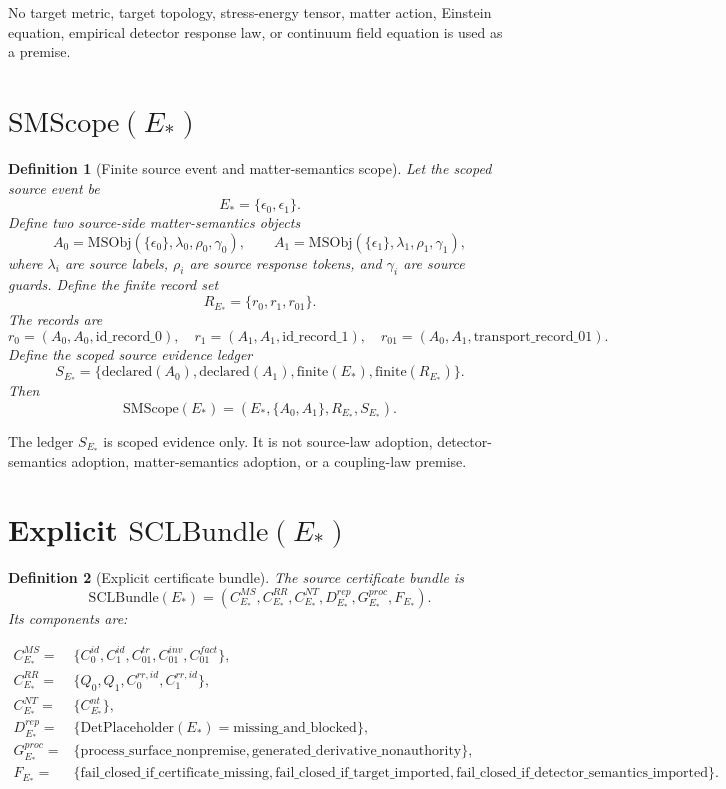 \documentclass[11pt]{article}
\newcommand{\EStar}{E_{\ast}}
\newcommand{\SMScope}{\mathrm{SMScope}}
\newcommand{\SCLBundle}{\mathrm{SCLBundle}}
\newcommand{\DetPlaceholder}{\mathrm{DetPlaceholder}}
\newcommand{\MSObj}{\mathrm{MSObj}}
\newtheorem{definition}{Definition}
\begin{document}
No target metric, target topology, stress-energy tensor, matter action,
Einstein equation, empirical detector response law, or continuum field
equation is used as a premise.

\section{\(\SMScope(\EStar)\)}

\begin{definition}[Finite source event and matter-semantics scope]
Let the scoped source event be
\[
  \EStar=\{\epsilon_0,\epsilon_1\}.
\]
Define two source-side matter-semantics objects
\[
  A_0=\MSObj(\{\epsilon_0\},\lambda_0,\rho_0,\gamma_0),
  \qquad
  A_1=\MSObj(\{\epsilon_1\},\lambda_1,\rho_1,\gamma_1),
\]
where \(\lambda_i\) are source labels, \(\rho_i\) are source response tokens,
and \(\gamma_i\) are source guards. Define the finite record set
\[
  R_{\EStar}=\{r_0,r_1,r_{01}\}.
\]
The records are
\[
  r_0=(A_0,A_0,\mathrm{id\_record\_0}),\quad
  r_1=(A_1,A_1,\mathrm{id\_record\_1}),\quad
  r_{01}=(A_0,A_1,\mathrm{transport\_record\_01}).
\]
Define the scoped source evidence ledger
\[
  S_{\EStar}=
  \{\mathrm{declared}(A_0),\mathrm{declared}(A_1),
    \mathrm{finite}(\EStar),\mathrm{finite}(R_{\EStar})\}.
\]
Then
\[
  \SMScope(\EStar)=
  (\EStar,\{A_0,A_1\},R_{\EStar},S_{\EStar}).
\]
\end{definition}

The ledger \(S_{\EStar}\) is scoped evidence only. It is not source-law
adoption, detector-semantics adoption, matter-semantics adoption, or a
coupling-law premise.

\section{Explicit \(\SCLBundle(\EStar)\)}

\begin{definition}[Explicit certificate bundle]
The source certificate bundle is
\[
  \SCLBundle(\EStar)=
  (C^{MS}_{\EStar},C^{RR}_{\EStar},C^{NT}_{\EStar},
   D^{rep}_{\EStar},G^{proc}_{\EStar},F_{\EStar}).
\]
Its components are:

\begin{align*}
 C^{MS}_{\EStar}={}&
 \{C^{id}_0,C^{id}_1,C^{tr}_{01},C^{inv}_{01},C^{fact}_{01}\},\\
 C^{RR}_{\EStar}={}&
 \{Q_0,Q_1,C^{rr,id}_0,C^{rr,id}_1\},\\
 C^{NT}_{\EStar}={}&
 \{C^{nt}_{\EStar}\},\\
 D^{rep}_{\EStar}={}&
 \{\DetPlaceholder(\EStar)=
   \mathrm{missing\_and\_blocked}\},\\
 G^{proc}_{\EStar}={}&
 \{\mathrm{process\_surface\_nonpremise},
   \mathrm{generated\_derivative\_nonauthority}\},\\
 F_{\EStar}={}&
 \{\mathrm{fail\_closed\_if\_certificate\_missing},
   \mathrm{fail\_closed\_if\_target\_imported},
   \mathrm{fail\_closed\_if\_detector\_semantics\_imported}\}.
\end{align*}
\end{definition}
\end{document}

